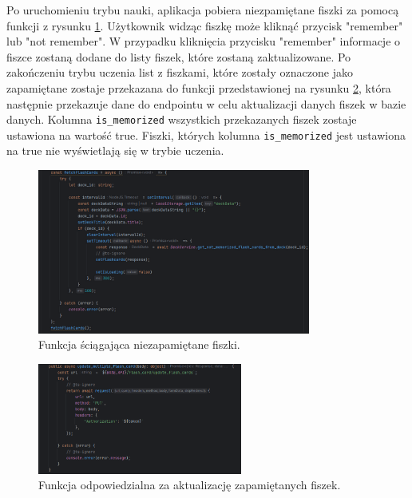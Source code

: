 Po uruchomieniu trybu nauki, aplikacja pobiera niezpamiętane fiszki za pomocą funkcji z rysunku \ref{img:get_unmemorized_flash_cards_web}. Użytkownik widząc fiszkę może kliknąć przycisk "remember" lub "not remember". W przypadku kliknięcia przycisku "remember" informacje o fiszce zostaną dodane do listy fiszek, które zostaną zaktualizowane. Po zakończeniu trybu uczenia list z fiszkami, które zostały oznaczone jako zapamiętane zostaje przekazana do funkcji przedstawionej na rysunku \ref{img:update_unmemorized_flash_cards_web}, która następnie przekazuje dane do endpointu w celu aktualizacji danych fiszek w bazie danych. Kolumna \texttt{is\_memorized} wszystkich przekazanych fiszek zostaje ustawiona na wartość true. Fiszki, których kolumna \texttt{is\_memorized} jest ustawiona na true nie wyświetlają się w trybie uczenia.

\begin{figure}[H]
    \centering
    \includegraphics[width=0.8\textwidth]{chapters/chapter_8/screens/get_unmemorized_flash_cards_web}
    \caption{Funkcja ściągająca niezapamiętane fiszki.}
    \label{img:get_unmemorized_flash_cards_web}
\end{figure}

\begin{figure}[H]
    \centering
    \includegraphics[width=0.6\textwidth]{chapters/chapter_8/screens/update_unmemorized_flash_cards_web}
    \caption{Funkcja odpowiedzialna za aktualizację zapamiętanych fiszek.}
    \label{img:update_unmemorized_flash_cards_web}
\end{figure}

